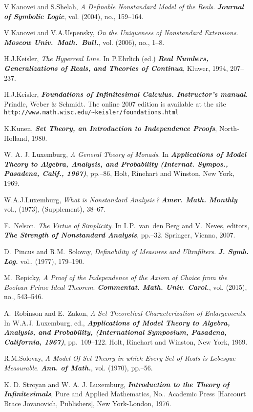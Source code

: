\documentclass[11pt,
]{article}
\begin{document}
{\begin{thebibliography}{10}
 V.\:Kanovei and S.\:Shelah, \emph{A Definable Nonstandard
Model of the Reals}.  \emph{\textbf{Journal of Symbolic Logic}},
vol. (2004), no., 159--164.

 V.\:Kanovei and V.\:A.\:Uspensky, \emph{On the
Uniqueness of Nonstandard Extensions}.  \emph{\textbf{Moscow Univ.\
Math.\ Bull.}}, vol. (2006), no., 1--8.

 H.\:J.\:Keisler, \emph{The Hyperreal Line}.  In
P.\:Ehrlich (ed.)  \emph{\textbf{Real Numbers, Generalizations of
Reals, and Theories of Continua}}, Kluwer, 1994, 207--237.

 H.\:J.\:Keisler, \emph{\textbf{Foundations of
Infinitesimal Calculus.  Instructor's manual}}.  Prindle, Weber \&
Schmidt.  The online 2007 edition is available at the site {\tt
http://www.math.wisc.edu/\~{}keisler/foundations.html}


 K.\:Kunen, \emph{\textbf{Set Theory, an Introduction to
Independence Proofs}}, North-Holland, 1980.



 W. A. J.  Luxemburg, \emph{A General Theory of Monads}.
In \emph{\textbf{Applications of Model Theory to Algebra, Analysis,
and Probability (Internat. Sympos., Pasadena, Calif., 1967)}},
pp.--86, Holt, Rinehart and Winston, New York, 1969.


 W.\:A.\:J.\:Luxemburg, \emph{What is Nonstandard
Analysis\,?}  \emph{\textbf{Amer. Math. Monthly}} vol., (1973),
(Supplement), 38--67.


 E.~Nelson.  \emph{The Virtue of Simplicity}.  In
I.\,P.~van~den Berg and V.~Neves, editors, \emph{\textbf{The Strength
of Nonstandard Analysis}}, pp.\;27--32.  Springer, Vienna, 2007.

 D.~Pincus and R.\:M.~Solovay, \emph{Definability of
Measures and Ultrafilters}.  \emph{\textbf{J. Symb. Log.}} vol.,
(1977), 179--190.

 M.~Repicky, \emph{A Proof of the Independence of the
Axiom of Choice from the Boolean Prime Ideal Theorem}.
\emph{\textbf{Commentat. Math. Univ. Carol.}}, vol. (2015),
no., 543--546.

 A.~Robinson and E.~Zakon, \emph{A Set-Theoretical
Characterization of Enlargements}.  In W.A.J. Luxemburg, ed.,
\emph{\textbf{Applications of Model Theory to Algebra, Analysis, and
Probability, (International Symposium, Pasadena, California, 1967)}},
pp.\ 109--122.  Holt, Rinehart and Winston, New York, 1969.



 R.\:M.\:Solovay, \emph{A Model Of Set Theory in which
Every Set of Reals is Lebesgue Measurable}.  \emph{\textbf{Ann. of
Math.}}, vol.\;92 (1970), pp.\;1--56.

 K. D.  Stroyan and W. A. J. Luxemburg,
\emph{\textbf{Introduction to the Theory of Infinitesimals}}, Pure and
Applied Mathematics, No.\;72.  Academic Press [Harcourt Brace
Jovanovich, Publishers], New York-London, 1976.

\end{thebibliography}
} 
\end{document}
